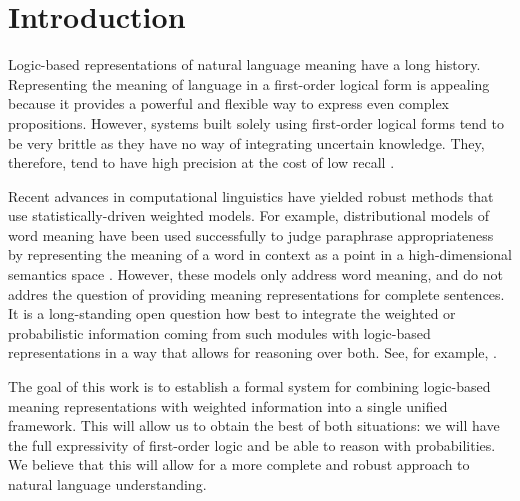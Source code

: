 \section{Introduction}

Logic-based representations of natural language meaning have a long history.
Representing the meaning of language in a first-order logical form is appealing
because it provides a powerful and flexible way to express even complex
propositions. However, systems built solely using first-order logical forms tend
to be very brittle as they have no way of integrating uncertain knowledge.
They, therefore, tend to have high precision at the cost of low recall
\citep{bos:emnlp2005}.

Recent advances in computational linguistics have yielded robust methods that
use statistically-driven weighted models.  For example, distributional
models of word meaning have been used successfully to judge paraphrase
appropriateness by representing the meaning of a word in context as a point in a
high-dimensional semantics space
\citep{erk:emnlp2008,thater:acl2010,reisinger:naacl2010,dinu:emnlp2010,vandecruys:emnlp2011}.
However, these models only address word meaning, and do not
addres the question of providing meaning representations for complete
sentences. It is a long-standing open question how best to
integrate the weighted or probabilistic information coming from such modules
with logic-based representations in a way that allows for reasoning over both. 
See, for example, \citet{hobbs:alj93}.

The goal of this work is to establish a formal system for combining
logic-based meaning representations with weighted information into a single
unified framework.  This will allow us to obtain the best of both situations: we
will have the full expressivity of first-order logic and be able to reason with
probabilities.  We believe that this will allow for a more complete and robust
approach to natural language understanding.

